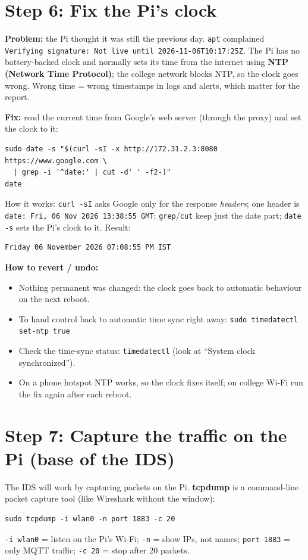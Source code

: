 \documentclass[11pt]{article}
\begin{document}
\section*{Step 6: Fix the Pi's clock}
\textbf{Problem:} the Pi thought it was still the previous day. \texttt{apt} complained
\texttt{Verifying signature: Not live until 2026-11-06T10:17:25Z}. The Pi has no battery-backed clock and normally sets its time from the internet
using \textbf{NTP (Network Time Protocol)}; the college network blocks NTP, so the clock goes wrong. Wrong time = wrong timestamps in logs and alerts,
which matter for the report.

\textbf{Fix:} read the current time from Google's web server (through the proxy) and set the clock to it:
\begin{verbatim}
sudo date -s "$(curl -sI -x http://172.31.2.3:8080 https://www.google.com \
  | grep -i '^date:' | cut -d' ' -f2-)"
date
\end{verbatim}
How it works: \texttt{curl -sI} asks Google only for the response \emph{headers}; one header is \texttt{date: Fri, 06 Nov 2026 13:38:55 GMT};
\texttt{grep}/\texttt{cut} keep just the date part; \texttt{date -s} sets the Pi's clock to it. Result:
\begin{verbatim}
Friday 06 November 2026 07:08:55 PM IST
\end{verbatim}

\textbf{How to revert / undo:}
\begin{itemize}
\item Nothing permanent was changed: the clock goes back to automatic behaviour on the next reboot.
\item To hand control back to automatic time sync right away: \texttt{sudo timedatectl set-ntp true}
\item Check the time-sync status: \texttt{timedatectl} (look at ``System clock synchronized'').
\item On a phone hotspot NTP works, so the clock fixes itself; on college Wi-Fi run the fix again after each reboot.
\end{itemize}

\newpage
\section*{Step 7: Capture the traffic on the Pi (base of the IDS)}
The IDS will work by capturing packets on the Pi. \textbf{tcpdump} is a command-line packet capture tool (like Wireshark without the window):
\begin{verbatim}
sudo tcpdump -i wlan0 -n port 1883 -c 20
\end{verbatim}
\texttt{-i wlan0} = listen on the Pi's Wi-Fi; \texttt{-n} = show IPs, not names; \texttt{port 1883} = only MQTT traffic; \texttt{-c 20} = stop after 20 packets.
\end{document}
